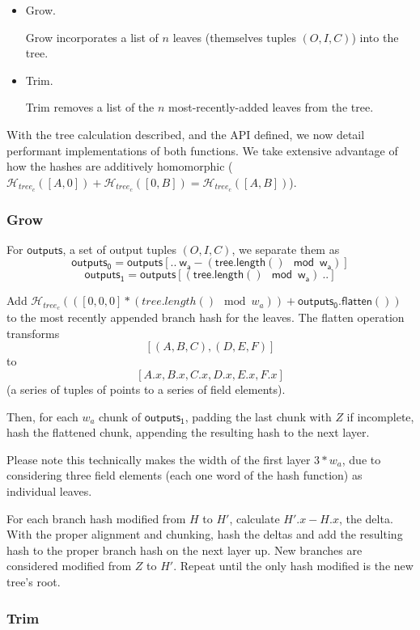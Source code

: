 \documentclass[]{article}
\begin{document}
\begin{itemize}
  \item Grow.
  
  Grow incorporates a list of $n$ leaves (themselves tuples $(O, I, C)$) into the tree.
  \item Trim.

  Trim removes a list of the $n$ most-recently-added leaves from the tree.
\end{itemize}

With the tree calculation described, and the API defined, we now detail performant implementations of both functions. We take extensive advantage of how the hashes are additively homomorphic ($\mathcal{H}_{tree_c}([A, 0]) + \mathcal{H}_{tree_c}([0, B]) = \mathcal{H}_{tree_c}([A, B])$).

\subsubsection{Grow}

For $\mathsf{outputs}$, a set of output tuples $(O, I, C)$, we separate them as
$$
\mathsf{outputs_0} = \mathsf{outputs[.. ~w_a - (tree.length() \mod w_a)]}
$$
$$
\mathsf{outputs_1} = \mathsf{outputs[(tree.length() \mod w_a) ~..]}
$$

Add $\mathcal{H}_{tree_c}(([0, 0, 0] * (tree.length() \mod w_a)) + \mathsf{outputs_0.flatten()})$ to the most recently appended branch hash for the leaves. The flatten operation transforms $$[(A, B, C), (D, E, F)]$$ to $$[
A.x, B.x, C.x,
D.x, E.x, F.x
]$$
(a series of tuples of points to a series of field elements).

Then, for each $w_a$ chunk of $\mathsf{outputs_1}$, padding the last chunk with $Z$ if incomplete, hash the flattened chunk, appending the resulting hash to the next layer.

Please note this technically makes the width of the first layer $3 * w_a$, due to considering three field elements (each one word of the hash function) as individual leaves.

For each branch hash modified from $H$ to $H'$, calculate $H'.x - H.x$, the delta. With the proper alignment and chunking, hash the deltas and add the resulting hash to the proper branch hash on the next layer up. New branches are considered modified from $Z$ to $H'$. Repeat until the only hash modified is the new tree's root.

\subsubsection{Trim}
\end{document}
